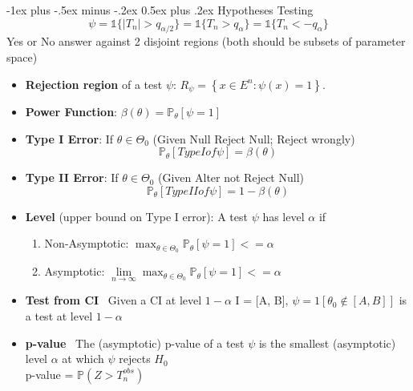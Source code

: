 \documentclass[a4paper, 10pt,landscape]{article}
\makeatletter
\renewcommand{\section}{\@startsection{section}{1}{0mm}%
                                {-1ex plus -.5ex minus -.2ex}%
                                {0.5ex plus .2ex}%
                                {\normalfont\large\bfseries}}
\makeatother
\begin{document}
\begin{multicols*}{4}
\section{Hypotheses Testing}
$$\psi=\mathds{1}\{|T_n|>q_{\alpha / 2}\}=\mathds{1}\{T_n >q_{\alpha}\}=\mathds{1}\{T_n <-q_{\alpha}\}$$ Yes or No answer against 2 disjoint regions (both should be subsets of parameter space)
	\begin{itemize}
		\item {\bf Rejection region} of a test $\psi$: $R_\psi=\left\{x\in E^n:\psi(x)=1\right\}.$
		\item {\bf Power Function}: $\beta(\theta) = \mathbb{P}_{\theta}[\psi = 1]$ 
		\item {\bf Type I Error}: If $\theta \in \Theta_0$ (Given Null Reject Null; Reject wrongly)
			$$ \mathbb{P}_{\theta}[Type I of \psi] = \beta(\theta)$$
		\item{\bf Type II Error}: If $\theta \in \Theta_0$ (Given Alter not Reject Null)
			$$\mathbb{P}_{\theta}[Type II of \psi] = 1 - \beta(\theta)$$
		\item{\bf Level} (upper bound on Type I error): A test $\psi$ has level $\alpha$ if 
			\begin{enumerate}
				\item Non-Asymptotic: $\max_{\theta \in \Theta_0} \mathbb{P}_{\theta}[\psi = 1] <= \alpha$
				\item Asymptotic:  $\lim\limits_{n\rightarrow\infty} \max_{\theta \in \Theta_0} \mathbb{P}_{\theta}[\psi = 1] <= \alpha$
			\end{enumerate}
		\item{\bf Test from CI}~
			 Given a CI at level $1-\alpha$ I = [A, B], $\psi = 1 [\theta_0 \notin [A, B]]$ is a test at level $1-\alpha$

		\item {\bf p-value}~
			The (asymptotic) p-value of a test $\psi$ is the smallest (asymptotic) level $\alpha$ at which $\psi$ rejects $H_0$ \\
			p-value = $\mathbb{P}(Z > T_n^{obs})$	
	\end{itemize}


\end{multicols*}
\end{document}
